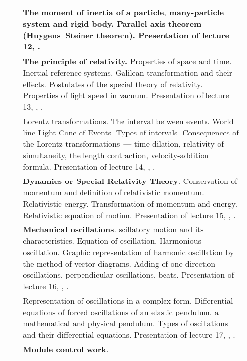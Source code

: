 \documentclass{rnp}
\begin{document}
\begin{longtable}{|>{\arraybackslash}m{0.06\linewidth}|>{\raggedright\arraybackslash}m{0.9\linewidth}|}
	\hline
	\thead{\rownumber.} 
	& The moment of inertia of a particle, many-particle system and rigid body. Parallel axis theorem (Huygens–Steiner theorem). \newline
	Presentation of lecture 12, \cite[Chapter 8 (MOMENTS OF INERTIA, Parallel Axis Theorem)]{BerkeleyMechanics}.
	\\  
	\hline
	\thead{\rownumber.} 
	& \textbf{The principle of relativity.} Properties of space and time. Inertial reference systems. Galilean transformation and their effects. Postulates of the special theory of relativity. Properties of light speed in vacuum.
	\newline
	Presentation of lecture 13, \cite[\S~6.1, 6.2, 6.3]{IrodovMechanics}, \cite[Chapter 10]{BerkeleyMechanics}.
	\\  
	\hline
	\thead{\rownumber.} 
	& Lorentz transformations. The interval between events. World line Light Cone of Events. Types of intervals. Consequences of the Lorentz transformations~--- time dilation, relativity of simultaneity, the length contraction, velocity-addition formula.\newline
	Presentation of lecture 14, \cite[\S~6.4, 6.5, 6.6]{IrodovMechanics}, \cite[Chapter 11]{BerkeleyMechanics}.
	\\  
	\hline
	\thead{\rownumber.} 
	& \textbf{Dynamics or Special Relativity Theory}. Conservation of momentum and definition of relativistic momentum. Relativistic energy.	Transformation of momentum and energy. Relativistic equation of motion.
	\newline
	Presentation of lecture 15, \cite[Chapter 7]{IrodovMechanics}, \cite[Chapter 12]{BerkeleyMechanics}.
	\\  
	\hline
	\thead{\rownumber.} 
	&\textbf{Mechanical oscillations}. scillatory motion and its characteristics.
		Equation of oscillation. Harmonious oscillation. Graphic representation of harmonic oscillation by the method of vector diagrams.  Adding of one direction oscillations, perpendicular oscillations, beats.
		\newline
	Presentation of lecture 16, \cite[Chapter 1]{BerkeleyWaves}, \cite[Sections 15-1 -- 15-3]{Holyday}.
	\\  
	\hline
	\thead{\rownumber.} 
	& Representation of oscillations in a complex form. Differential equations of forced oscillations of an elastic pendulum, a mathematical and physical pendulum. Types of oscillations and their differential equations.
	\newline
	Presentation of lecture 17, \cite[Chapter 3]{BerkeleyMechanics}, \cite[Sections 15-4, 15-5, 15-6]{Holyday}.
	\\  
	\hline
	\thead{\rownumber.} 
	& \textbf{Module control work}.
	\\  
	\hline
\end{longtable} 
\end{document}
